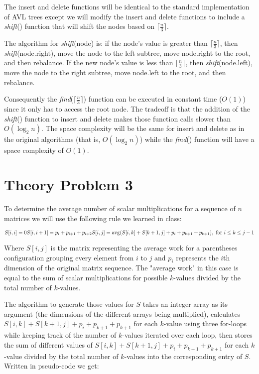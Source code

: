 \documentclass[11pt]{article}
\begin{document}
The insert and delete functions will be identical to the standard implementation of AVL trees except we will modify the insert and delete functions to include a \textit{shift}() function that will shift the nodes based on $\lceil \frac{n}{3} \rceil$.

The algorithm for \textit{shift}(node) is: if the node's value is greater than $\lceil \frac{n}{3} \rceil$, then \textit{shift}(node.right), move the node to the left subtree, move node.right to the root, and then rebalance. If the new node's value is less than $\lceil \frac{n}{3} \rceil$, then \textit{shift}(node.left), move the node to the right subtree, move node.left to the root, and then rebalance.

Consequently the \textit{find}($\lceil \frac{n}{3} \rceil$) function can be executed in constant time ($O(1)$) since it only has to access the root node. The tradeoff is that the addition of the \textit{shift}() function to insert and delete makes those function calls slower than $O(\log_2 n)$. The space complexity will be the same for insert and delete as in the original algorithms (that is, $O(\log_2 n)$) while the \textit{find}() function will have a space complexity of $O(1)$.

\section*{Theory Problem 3}

To determine the average number of scalar multiplications for a sequence of $n$ matrices we will use the following rule we learned in class:

$ S[i,i] = 0 \\ S[i,i+1] = p_i + p_{i+1} + p_{i+2} \\
S[i,j] = \operatorname{avg}(S[i,k] + S[k+1,j] + p_i + p_{k+1} + p_{k+1}), \text{ for } i \leq k \leq j-1 $

Where $S[i,j]$ is the matrix representing the average work for a parentheses configuration grouping every element from $i$ to $j$ and $p_i$ represents the $i$th dimension of the original matrix sequence. The "average work" in this case is equal to the sum of scalar multiplications for possible $k$-values divided by the total number of $k$-values.

The algorithm to generate those values for $S$ takes an integer array as its argument (the dimensions of the different arrays being multiplied), calculates $S[i,k] + S[k+1,j] + p_i + p_{k+1} + p_{k+1}$ for each $k$-value using three for-loops while keeping track of the number of $k$-values iterated over each loop, then stores the sum of different values of $S[i,k] + S[k+1,j] + p_i + p_{k+1} + p_{k+1}$ for each $k$-value divided by the total number of $k$-values into the corresponding entry of $S$. Written in pseudo-code we get:
\end{document}
